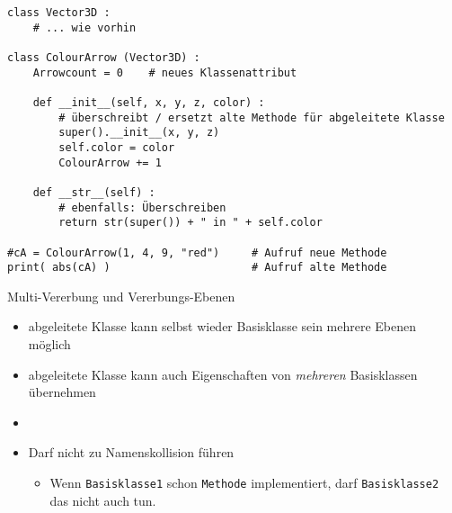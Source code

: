 \begin{frame}[fragile]
%
\begin{codebox}
\begin{verbatim}
class Vector3D :
    # ... wie vorhin

class ColourArrow (Vector3D) :
    Arrowcount = 0    # neues Klassenattribut
    
    def __init__(self, x, y, z, color) :
        # überschreibt / ersetzt alte Methode für abgeleitete Klasse
        super().__init__(x, y, z)
        self.color = color
        ColourArrow += 1
    
    def __str__(self) :
        # ebenfalls: Überschreiben
        return str(super()) + " in " + self.color

#cA = ColourArrow(1, 4, 9, "red")     # Aufruf neue Methode
print( abs(cA) )                      # Aufruf alte Methode
\end{verbatim}
\end{codebox}
%
\end{frame}


\begin{frame}[fragile]{Multi-Vererbung und Vererbungs-Ebenen}
%
\begin{itemize}
\item abgeleitete Klasse kann selbst wieder Basisklasse sein \Thus mehrere Ebenen möglich
\item abgeleitete Klasse kann auch Eigenschaften von \emph{mehreren} Basisklassen übernehmen
\item {}
\item Darf nicht zu Namenskollision führen
	\begin{itemize}
	\item[\Thus] Wenn \texttt{Basisklasse1} schon \texttt{Methode} implementiert, darf \texttt{Basisklasse2} das nicht auch tun.
	\end{itemize}
\end{itemize}
%
\end{frame}


